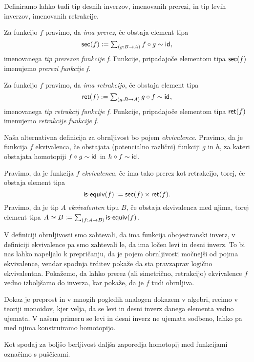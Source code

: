 Definiramo lahko tudi tip desnih inverzov, imenovanih prerezi, in tip levih inverzov, imenovanih retrakcije.
\begin{definicija}
  Za funkcijo \(f\) pravimo, da \emph{ima prerez}, če obstaja element tipa
  \[\textnormal{\textsf{sec}}(f) := \textstyle \sum_{\left( g : B \to A \right)} f \circ g \sim \textnormal{\textsf{id}}_{},\]
  imenovanega \emph{tip prerezov funkcije f}.
  Funkcije, pripadajoče elementom tipa \(\textnormal{\textsf{sec}}(f)\) imenujemo \emph{prerezi funkcije f}.

  Za funkcijo \(f\) pravimo, da \emph{ima retrakcijo}, če obstaja element tipa
  \[\textnormal{\textsf{ret}}(f) := \textstyle \sum_{\left( g : B \to A \right)} g \circ f \sim \textnormal{\textsf{id}}_{},\]
  imenovanega \emph{tip retrakcij funkcije f}.
  Funkcije, pripadajoče elementom tipa \(\textnormal{\textsf{ret}}(f)\) imenujemo \emph{retrakcije funkcije f}.
\end{definicija}

Naša alternativna definicija za obrnljivost bo pojem \emph{ekvivalence}. Pravimo, da je funkcija \(f\) ekvivalenca, če obstajata (potencialno različni) funkciji \(g\) in \(h\), za kateri obstajata homotopiji \(f \circ g \sim \textnormal{\textsf{id}}_{}\) in \(h \circ f \sim \textnormal{\textsf{id}}_{}\).

\begin{definicija}
  Pravimo, da je funkcija \(f\) \emph{ekvivalenca}, če ima tako prerez kot retrakcijo,
  torej, če obstaja element tipa \[\textnormal{\textsf{is-equiv}}(f) := \textnormal{\textsf{sec}}(f) \times \textnormal{\textsf{ret}}(f).\]
  Pravimo, da je tip \(A\) \emph{ekvivalenten} tipu \(B\), če obstaja ekvivalenca med
  njima, torej element tipa \(A \simeq B := \textstyle \sum_{\left( f : A \to B \right)} \textnormal{\textsf{is-equiv}}(f)\).
\end{definicija}

V definiciji obrnljivosti smo zahtevali, da ima funkcija obojestranski inverz, v
definiciji ekvivalence pa smo zahtevali le, da ima ločen levi in desni inverz.
To bi nas lahko napeljalo k prepričanju, da je pojem obrnljivosti močnejši od pojma ekvivalence, vendar spodnja trditev pokaže da sta pravzaprav logično ekvivalentna. Pokažemo, da lahko prerez (ali simetrično, retrakcijo) ekvivalence \(f\) vedno izboljšamo do inverza, kar pokaže, da je \(f\) tudi obrnljiva.

Dokaz je preprost in v mnogih pogledih analogen dokazem v algebri, recimo v teoriji monoidov, kjer velja, da se levi in desni inverz danega elementa vedno ujemata. V našem primeru se levi in desni inverz ne ujemata sodbeno, lahko pa med njima konstruiramo homotopijo.

Kot spodaj za boljšo berljivost daljša zaporedja homotopij med funkcijami označimo s puščicami.

